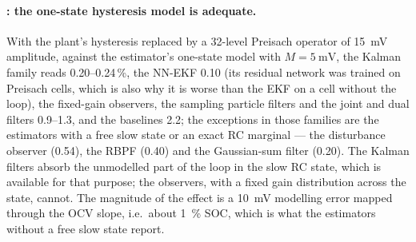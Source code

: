 \paragraph{: the one-state hysteresis model is adequate.}
With the plant's hysteresis replaced by a 32-level Preisach operator of \SI{15}{\milli\volt}
amplitude, against the estimator's one-state model with $M = \SI{5}{\milli\volt}$, the Kalman
family reads \num{0.20}--\num{0.24}\,\%, the NN-EKF \num{0.10} (its residual network was trained on
Preisach cells, which is also why it is worse than the EKF on a cell without the loop), the fixed-gain observers, the sampling particle filters and the joint and dual filters
\num{0.9}--\num{1.3}, and the baselines \num{2.2}; the exceptions in those families are the
estimators with a free slow state or an exact RC marginal --- the disturbance observer
(\num{0.54}), the RBPF (\num{0.40}) and the Gaussian-sum filter (\num{0.20}). The Kalman
filters absorb the unmodelled part of the loop in the slow RC state, which is available for
that purpose; the observers, with a fixed gain distribution across the state, cannot. The magnitude of the effect is a \SI{10}{\milli\volt}
modelling error mapped through the OCV slope, i.e.\ about \SI{1}{\percent} SOC, which is what
the estimators without a free slow state report.

